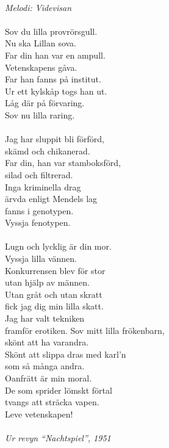 \\
{\footnotesize\textit{Melodi: Videvisan}}\\
\\
Sov du lilla provrörsgull.\\
Nu ska Lillan sova.\\
Far din han var en ampull.\\
Vetenskapens gåva.\\
Far han fanns på institut.\\
Ur ett kylskåp togs han ut.\\
Låg där på förvaring.\\
Sov nu lilla raring.\\
\\
Jag har sluppit bli förförd,\\
skämd och chikanerad.\\
Far din, han var stamboksförd,\\
silad och filtrerad.\\
Inga kriminella drag\\
ärvda enligt Mendels lag\\
fanns i genotypen.\\
Vyssja fenotypen.\\
\\
Lugn och lycklig är din mor.\\
Vyssja lilla vännen.\\
Konkurrensen blev för stor\\
utan hjälp av männen.\\
Utan gråt och utan skratt\\
fick jag dig min lilla skatt.\\
Jag har valt tekniken\\
framför erotiken.
\newpage
Sov mitt lilla frökenbarn,\\
skönt att ha varandra.\\
Skönt att slippa dras med karl'n\\
som så många andra.\\
Oanfrätt är min moral.\\
De som sprider lömskt förtal\\
tvangs att sträcka vapen.\\
Leve vetenskapen!\\
\\
{\footnotesize\textit{Ur revyn “Nachtspiel”, 1951}}
